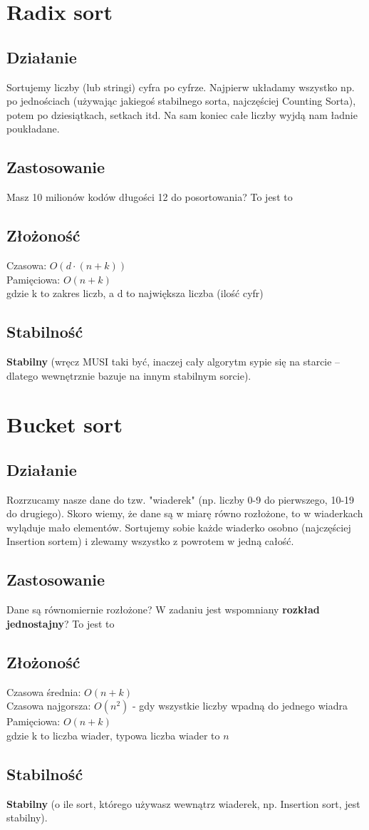\documentclass[12pt]{article}
\begin{document}
\section{Radix sort}
\subsection{Działanie}
Sortujemy liczby (lub stringi) cyfra po cyfrze. Najpierw układamy wszystko np. po jednościach (używając jakiegoś stabilnego sorta, najczęściej Counting Sorta), potem po dziesiątkach, setkach itd. Na sam koniec całe liczby wyjdą nam ładnie poukładane.
\subsection{Zastosowanie}
Masz 10 milionów kodów długości 12 do posortowania? To jest to
\subsection{Złożoność}
Czasowa: $O(d \cdot (n+k))$\\
Pamięciowa: $O(n+k)$\\
gdzie k to zakres liczb, a d to największa liczba (ilość cyfr)
\subsection{Stabilność}
\textbf{Stabilny} (wręcz MUSI taki być, inaczej cały algorytm sypie się na starcie – dlatego wewnętrznie bazuje na innym stabilnym sorcie).

\section{Bucket sort}
\subsection{Działanie}
Rozrzucamy nasze dane do tzw. "wiaderek" (np. liczby 0-9 do pierwszego, 10-19 do drugiego). Skoro wiemy, że dane są w miarę równo rozłożone, to w wiaderkach wyląduje mało elementów. Sortujemy sobie każde wiaderko osobno (najczęściej Insertion sortem) i zlewamy wszystko z powrotem w jedną całość.
\subsection{Zastosowanie}
Dane są równomiernie rozłożone? W zadaniu jest wspomniany \textbf{rozkład jednostajny}? To jest to
\subsection{Złożoność}
Czasowa średnia: $O(n+k)$\\
Czasowa najgorsza: $O(n^2)$ - gdy wszystkie liczby wpadną do jednego wiadra\\
Pamięciowa: $O(n+k)$\\
gdzie k to liczba wiader, typowa liczba wiader to $n$
\subsection{Stabilność}
\textbf{Stabilny} (o ile sort, którego używasz wewnątrz wiaderek, np. Insertion sort, jest stabilny).
\end{document}
